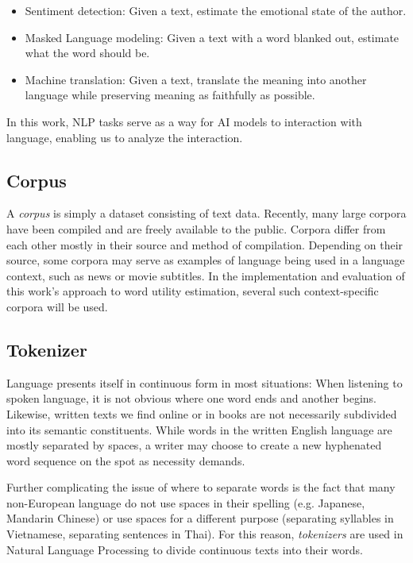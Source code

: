 \begin{itemize}
	\item Sentiment detection: Given a text, estimate the emotional state of the author.
	\item Masked Language modeling: Given a text with a word blanked out, estimate what the word should be.
	\item Machine translation: Given a text, translate the meaning into another language while preserving meaning as faithfully as possible.
\end{itemize}

In this work, NLP tasks serve as a way for AI models to interaction with language, enabling us to analyze the interaction.

\subsection{Corpus}
A \textit{corpus} is simply a dataset consisting of text data.
Recently, many large corpora have been compiled and are freely available to the public.
Corpora differ from each other mostly in their source and method of compilation.
Depending on their source, some corpora may serve as examples of language being used in a language context, such as news or movie subtitles.
In the implementation and evaluation of this work's approach to word utility estimation, several such context-specific corpora will be used.

\subsection{Tokenizer}
Language presents itself in continuous form in most situations:
When listening to spoken language, it is not obvious where one word ends and another begins.
Likewise, written texts we find online or in books are not necessarily subdivided into its semantic constituents.
While words in the written English language are mostly separated by spaces, a writer may choose to create a new hyphenated word sequence on the spot as necessity demands.

Further complicating the issue of where to separate words is the fact that many non-European language do not use spaces in their spelling (e.g. Japanese, Mandarin Chinese) or use spaces for a different purpose (separating syllables in Vietnamese, separating sentences in Thai).
For this reason, \textit{tokenizers} are used in Natural Language Processing to divide continuous texts into their words. 

